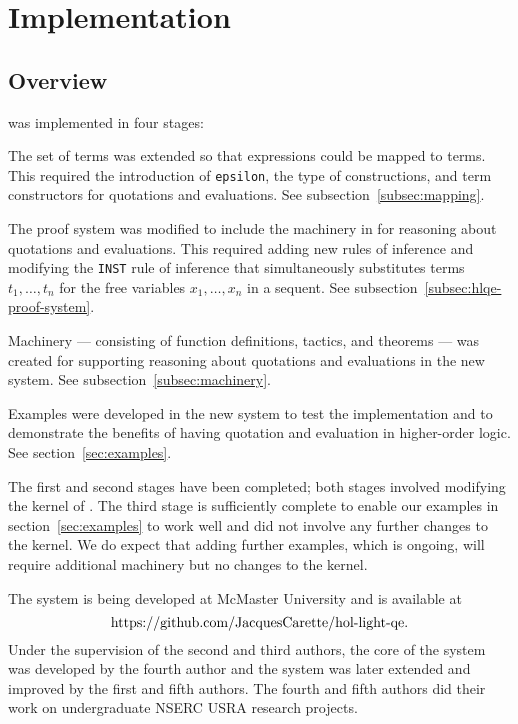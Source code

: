 \documentclass[fleqn]{llncs}
\begin{document}
\section{Implementation}\label{sec:implementation}

\subsection{Overview}

{\HLQE} was implemented in four stages:

\be

  \item The set of terms was extended so that {\churchqe}
    expressions could be mapped to {\HL} terms.  This required the
    introduction of \texttt{epsilon}, the type of constructions, and
    term constructors for quotations and evaluations.  See
    subsection~\ref{subsec:mapping}.

  \item The proof system was modified to include the machinery
    in {\churchqe} for reasoning about quotations and evaluations.
    This required adding new rules of inference and modifying
    the \texttt{INST} rule of inference that simultaneously
    substitutes terms $t_1,\ldots,t_n$ for the free variables
    $x_1,\ldots,x_n$ in a sequent.  See
    subsection~\ref{subsec:hlqe-proof-system}.

  \item Machinery --- consisting of {\HOL} function definitions,
    tactics, and theorems --- was created for supporting reasoning
    about quotations and evaluations in the new system.  See
    subsection~\ref{subsec:machinery}.

  \item Examples were developed in the new system to test the
    implementation and to demonstrate the benefits of having quotation
    and evaluation in higher-order logic.  See section~\ref{sec:examples}.

\ee

\noindent
The first and second stages have been completed; both stages involved
modifying the kernel of {\HL}.  The third stage is sufficiently
complete to enable our examples in section~\ref{sec:examples} to work
well and did not involve any further changes to the {\HL} kernel.  We
do expect that adding further examples, which is ongoing, will require
additional machinery but no changes to the kernel.

The {\HLQE} system is being developed at McMaster University and is available at
\[\mbox{https://github.com/JacquesCarette/hol-light-qe}.\]
Under the supervision of the second and third authors, the core of the
system was developed by the fourth author and the system was later
extended and improved by the first and fifth authors.  The fourth and
fifth authors did their work on undergraduate NSERC USRA research
projects.
\end{document}
